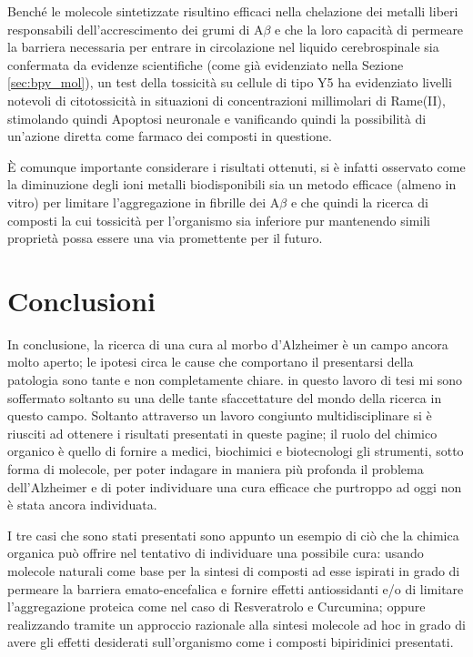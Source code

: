 \documentclass[a4paper, 12pt]{article}
\begin{document}
Benché le molecole sintetizzate risultino efficaci nella chelazione dei metalli liberi responsabili dell’accrescimento dei grumi di A$\beta$ e che la loro capacità di permeare la barriera necessaria per entrare in circolazione nel liquido cerebrospinale sia confermata da evidenze scientifiche (come già evidenziato nella Sezione \ref{sec:bpy_mol}), un test della tossicità su cellule di tipo Y5 ha evidenziato livelli notevoli di citotossicità in situazioni di concentrazioni millimolari di Rame(II), stimolando quindi Apoptosi neuronale e vanificando quindi la possibilità di un'azione diretta come farmaco dei composti in questione.

È comunque importante considerare i risultati ottenuti, si è infatti osservato come la diminuzione degli ioni metalli biodisponibili sia un metodo efficace (almeno in vitro) per limitare l'aggregazione in fibrille dei A$\beta$ e che quindi la ricerca di composti la cui tossicità per l'organismo sia inferiore pur mantenendo simili proprietà possa essere una via promettente per il futuro. \cite{ji_strategic_2017}

\section{Conclusioni}
In conclusione, la ricerca di una cura al morbo d'Alzheimer è un campo ancora molto aperto; le ipotesi circa le cause che comportano il presentarsi della patologia sono tante e non completamente chiare. in questo lavoro di tesi mi sono soffermato soltanto su una delle tante sfaccettature del mondo della ricerca in questo campo. Soltanto attraverso un lavoro congiunto multidisciplinare si è riusciti ad ottenere i risultati presentati in queste pagine; il ruolo del chimico organico è quello di fornire a medici, biochimici e biotecnologi gli strumenti, sotto forma di molecole, per poter indagare in maniera più profonda il problema dell'Alzheimer e di poter individuare una cura efficace che purtroppo ad oggi non è stata ancora individuata.

I tre casi che sono stati presentati sono appunto un esempio di ciò che la chimica organica può offrire nel tentativo di individuare una possibile cura: usando molecole naturali come base per la sintesi di composti ad esse ispirati in grado di permeare la barriera emato-encefalica e fornire effetti antiossidanti e/o di limitare l'aggregazione proteica come nel caso di Resveratrolo e Curcumina; oppure realizzando tramite un approccio razionale alla sintesi molecole ad hoc in grado di avere gli effetti desiderati sull'organismo come i composti bipiridinici presentati.
\end{document}
